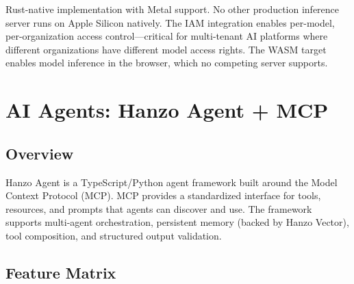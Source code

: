 \documentclass[11pt,twocolumn]{article}
\begin{document}
Rust-native implementation with Metal support. No other production inference server runs on Apple Silicon natively. The IAM integration enables per-model, per-organization access control---critical for multi-tenant AI platforms where different organizations have different model access rights. The WASM target enables model inference in the browser, which no competing server supports.

\section{AI Agents: Hanzo Agent + MCP}
\label{sec:agents}

\subsection{Overview}

Hanzo Agent is a TypeScript/Python agent framework built around the Model Context Protocol (MCP). MCP provides a standardized interface for tools, resources, and prompts that agents can discover and use. The framework supports multi-agent orchestration, persistent memory (backed by Hanzo Vector), tool composition, and structured output validation.

\subsection{Feature Matrix}
\end{document}
